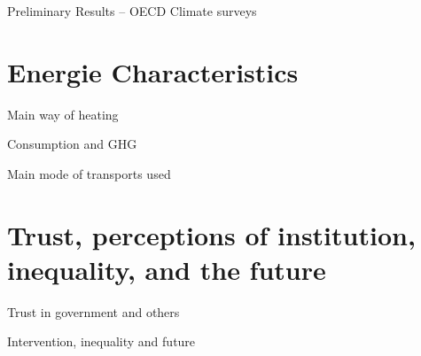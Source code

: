 \documentclass{article}
\begin{document}
\begin{LARGE}
	\begin{center}
		Preliminary Results – OECD Climate surveys	
	\end{center}
	
\end{LARGE}
	\tableofcontents
	\listoftables

\section{Energie Characteristics}

\begin{table}[h!]
	\caption{Main way of heating}
	\begin{center}
		\scalebox{0.7}{}
	\end{center}
\end{table}	

\begin{table}[h!]
	\caption{Consumption and GHG}
	\begin{center}
		\scalebox{0.7}{}
	\end{center}
\end{table}	

\begin{table}[h!]
	\caption{Main mode of transports used}
	\begin{center}
		\scalebox{0.7}{}
	\end{center}
\end{table}	

\section{Trust, perceptions of institution, inequality, and the future}

\begin{table}[h!]
	\caption{Trust in government and others}
	\begin{center}
		\scalebox{0.7}{}
	\end{center}
\end{table}	

\begin{table}[h!]
	\caption{Intervention, inequality and future}
	\begin{center}
		\scalebox{0.7}{}
	\end{center}
\end{table}	
\end{document}
